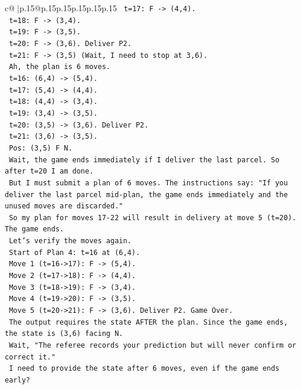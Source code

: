 \documentclass{article}
\begin{document}
{\begin{supertabular}{c@{$\;$}|p{.15\linewidth}@{}p{.15\linewidth}p{.15\linewidth}p{.15\linewidth}p{.15\linewidth}p{.15\linewidth}}
{{{\texttt{    t=17: F {-}> (4,4).} \\
\texttt{    t=18: F {-}> (3,4).} \\
\texttt{    t=19: F {-}> (3,5).} \\
\texttt{    t=20: F {-}> (3,6). Deliver P2.} \\
\texttt{    t=21: F {-}> (3,5) (Wait, I need to stop at 3,6).} \\
\texttt{    Ah, the plan is 6 moves.} \\
\texttt{    t=16: (6,4) {-}> (5,4).} \\
\texttt{    t=17: (5,4) {-}> (4,4).} \\
\texttt{    t=18: (4,4) {-}> (3,4).} \\
\texttt{    t=19: (3,4) {-}> (3,5).} \\
\texttt{    t=20: (3,5) {-}> (3,6). Deliver P2.} \\
\texttt{    t=21: (3,6) {-}> (3,5).} \\
\texttt{    Pos: (3,5) F N.} \\
\texttt{    Wait, the game ends immediately if I deliver the last parcel. So after t=20 I am done.} \\
\texttt{    But I must submit a plan of 6 moves. The instructions say: "If you deliver the last parcel mid{-}plan, the game ends immediately and the unused moves are discarded."} \\
\texttt{    So my plan for moves 17{-}22 will result in delivery at move 5 (t=20). The game ends.} \\
\texttt{    Let's verify the moves again.} \\
\texttt{    Start of Plan 4: t=16 at (6,4).} \\
\texttt{    Move 1 (t=16{-}>17): F {-}> (5,4).} \\
\texttt{    Move 2 (t=17{-}>18): F {-}> (4,4).} \\
\texttt{    Move 3 (t=18{-}>19): F {-}> (3,4).} \\
\texttt{    Move 4 (t=19{-}>20): F {-}> (3,5).} \\
\texttt{    Move 5 (t=20{-}>21): F {-}> (3,6). Deliver P2. Game Over.} \\
\texttt{    The output requires the state AFTER the plan. Since the game ends, the state is (3,6) facing N.} \\
\texttt{    Wait, "The referee records your prediction but will never confirm or correct it."} \\
\texttt{    I need to provide the state after 6 moves, even if the game ends early?} \\
}}}
\end{supertabular}}
\end{document}
